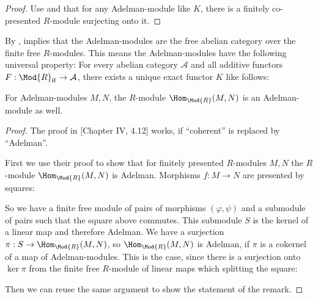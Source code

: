 \begin{proof}
   Use  and that for any Adelman-module like $K$, there is a finitely co-presented $R$-module surjecting onto it.
\end{proof}

\begin{remark}
  By \cite[Theorem 1.15]{adelman-construction},  implies that the Adelman-modules are the free abelian category over the finite free $R$-modules.
  This means the Adelman-modules have the following universal property:
  For every abelian category $\mathcal{A}$ and all additive functors $F:\Mod{R}_{\mathrm{ff}}\to \mathcal{A}$, there exists a unique exact functor $K$ like follows:
  \begin{center}
\end{center}
\end{remark}

\begin{remark}
  \label{hom-closure}
  For Adelman-modules $M,N$, the $R$-module $\Hom_{\Mod{R}}(M,N)$ is an Adelman-module as well.
\end{remark}

\begin{proof}
  The proof in \cite{lombardi-quitte}[Chapter IV, 4.12] works, if ``coherent'' is replaced by ``Adelman''.

  First we use their proof to show that for finitely presented $R$-modules $M,N$ the $R$-module $\Hom_{\Mod{R}}(M,N)$ is Adelman. Morphisms $f:M\to N$ are presented by squares:
  \begin{center}
\end{center}
  So we have a finite free module of pairs of morphisms $(\varphi,\psi)$ and a submodule of pairs such that the square above commutes.
  This submodule $S$ is the kernel of a linear map and therefore Adelman.
  We have a surjection $\pi:S\to \Hom_{\Mod{R}}(M,N)$, so $\Hom_{\Mod{R}}(M,N)$ is Adelman,
  if $\pi$ is a cokernel of a map of Adelman-modules.
  This is the case, since there is a surjection onto $\ker{\pi}$ from the finite free $R$-module of linear maps which splitting the square:
  \begin{center}
\end{center}
  Then we can reuse the same argument to show the statement of the remark.
\end{proof}

